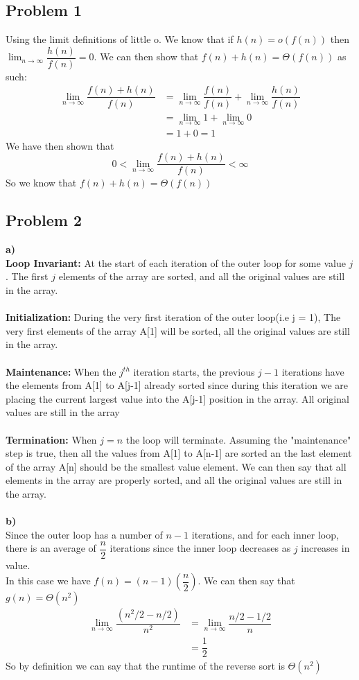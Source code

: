 \documentclass[12pt]{article}
\begin{document}
\subsection*{Problem 1}
Using the limit definitions of little o. We know that if $h(n) = o(f(n))$ then $\lim_{n \rightarrow \infty} \dfrac{h(n)}{f(n)} = 0$. We can then show that $f(n) + h(n) = \Theta(f(n))$ as such:
\begin{align*}
\lim_{n \rightarrow \infty}\dfrac{f(n) + h(n)}{f(n)} &= \lim_{n \rightarrow \infty}\dfrac{f(n)}{f(n)} + \lim_{n \rightarrow \infty}\dfrac{h(n)}{f(n)}\\
&= \lim_{n \rightarrow \infty} 1 + \lim_{n \rightarrow \infty} 0\\
&= 1 + 0 = 1
\end{align*}
We have then shown that 
\[ 0 < \lim_{n \rightarrow \infty}\dfrac{f(n) + h(n)}{f(n)} < \infty \]
So we know that $f(n) + h(n) = \Theta(f(n))$



\subsection*{Problem 2}
\textbf{a)}\\
\textbf{Loop Invariant:} At the start of each iteration of the outer loop for some value $j$. The first $j$ elements of the array are sorted, and all the original values are still in the array.\\\\
\textbf{Initialization:} During the very first iteration of the outer loop(i.e j = 1), The very first elements of the array A[1] will be sorted, all the original values are still in the array.\\\\
\textbf{Maintenance:} When the $j^{th}$ iteration starts, the previous $j-1$ iterations have the elements from A[1] to A[j-1] already sorted since during this iteration we are placing the current largest value into the A[j-1] position in the array. All original values are still in the array\\\\\textbf{Termination:} When $j=n$ the loop will terminate. Assuming the "maintenance" step is true, then all the values from A[1] to A[n-1] are sorted an the last element of the array A[n] should be the smallest value element. We can then say that all elements in the array are properly sorted, and all the original values are still in the array.\\\\
\textbf{b)}\\
Since the outer loop  has a number of $n-1$ iterations, and for each inner loop, there is an average of $\dfrac{n}{2}$ iterations since the inner loop decreases as $j$ increases in value.\\
In this case we have $f(n) = (n-1)(\dfrac{n}{2})$. We can then say that $g(n) = \Theta (n^2)$
\begin{align*}
\lim_{n \rightarrow \infty} \dfrac{(n^2/2-n/2)}{n^2} &= \lim_{n \rightarrow \infty} \dfrac{n/2 - 1/2}{n}\\
&= \dfrac{1}{2}
\end{align*}
So by definition we can say that the runtime of the reverse sort is $\Theta(n^2)$
\end{document}
